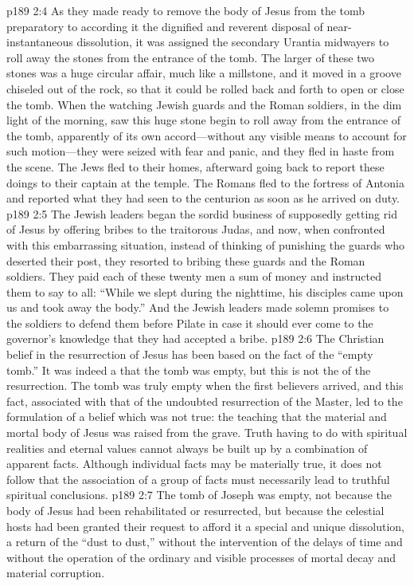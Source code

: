\vs p189 2:4 As they made ready to remove the body of Jesus from the tomb preparatory to according it the dignified and reverent disposal of near\hyp{}instantaneous dissolution, it was assigned the secondary Urantia midwayers to roll away the stones from the entrance of the tomb. The larger of these two stones was a huge circular affair, much like a millstone, and it moved in a groove chiseled out of the rock, so that it could be rolled back and forth to open or close the tomb. When the watching Jewish guards and the Roman soldiers, in the dim light of the morning, saw this huge stone begin to roll away from the entrance of the tomb, apparently of its own accord---without any visible means to account for such motion---they were seized with fear and panic, and they fled in haste from the scene. The Jews fled to their homes, afterward going back to report these doings to their captain at the temple. The Romans fled to the fortress of Antonia and reported what they had seen to the centurion as soon as he arrived on duty.
\vs p189 2:5 The Jewish leaders began the sordid business of supposedly getting rid of Jesus by offering bribes to the traitorous Judas, and now, when confronted with this embarrassing situation, instead of thinking of punishing the guards who deserted their post, they resorted to bribing these guards and the Roman soldiers. They paid each of these twenty men a sum of money and instructed them to say to all: “While we slept during the nighttime, his disciples came upon us and took away the body.” And the Jewish leaders made solemn promises to the soldiers to defend them before Pilate in case it should ever come to the governor’s knowledge that they had accepted a bribe.
\pc \vs p189 2:6 The Christian belief in the resurrection of Jesus has been based on the fact of the “empty tomb.” It was indeed a  that the tomb was empty, but this is not the  of the resurrection. The tomb was truly empty when the first believers arrived, and this fact, associated with that of the undoubted resurrection of the Master, led to the formulation of a belief which was not true: the teaching that the material and mortal body of Jesus was raised from the grave. Truth having to do with spiritual realities and eternal values cannot always be built up by a combination of apparent facts. Although individual facts may be materially true, it does not follow that the association of a group of facts must necessarily lead to truthful spiritual conclusions.
\vs p189 2:7 The tomb of Joseph was empty, not because the body of Jesus had been rehabilitated or resurrected, but because the celestial hosts had been granted their request to afford it a special and unique dissolution, a return of the “dust to dust,” without the intervention of the delays of time and without the operation of the ordinary and visible processes of mortal decay and material corruption.
